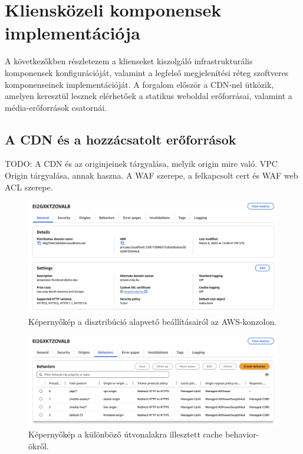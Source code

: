 \chapter{Kliensközeli komponensek implementációja}

A következőkben részletezem a klienseket kiszolgáló infrastrukturális komponensek konfigurációját, valamint a legfelső megjelenítési réteg szoftveres komponenseinek implementációját. A forgalom először a CDN-nel ütközik, amelyen keresztül lesznek elérhetőek a statikus weboldal erőforrásai, valamint a média-erőforrások csatornái.

\section{A CDN és a hozzácsatolt erőforrások}

TODO: A CDN és az originjeinek tárgyalása, melyik origin mire való. VPC Origin tárgyalása, annak haszna. A WAF szerepe, a felkapcsolt cert és WAF web ACL szerepe.

\begin{figure}[ht]
  \centering
  \includegraphics[width=150mm, keepaspectratio]{figures/distro_main.png}
  \caption{Képernyőkép a disztribúció alapvető beállításairól az AWS-konzolon.}
  \label{fig:distro}
\end{figure}

\begin{figure}[ht]
  \centering
  \includegraphics[width=150mm, keepaspectratio]{figures/distro_behav.png}
  \caption{Képernyőkép a különböző útvonalakra illesztett cache behavior-ökről.}
  \label{fig:behav}
\end{figure}

